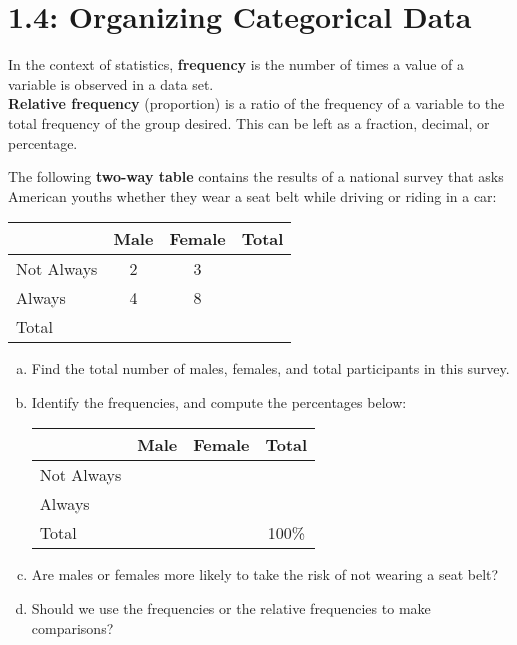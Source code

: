 \documentclass[../mathNotesPreamble]{subfiles}
\begin{document}
  \section{1.4: Organizing Categorical Data}
    \begin{defn*}
      In the context of statistics, \textbf{frequency} is the number of times a value of a variable is observed in a data set.\\
\textbf{Relative frequency} (proportion) is a ratio of the frequency of a variable to the total frequency of the group desired. This can be left as a fraction, decimal, or percentage.
    \end{defn*}

    \begin{ex*}
      The following \textbf{two-way table} contains the results of a national survey that asks American youths whether they wear a seat belt while driving or riding in a car:
    \end{ex*}
    \begin{center}
      \begin{tabular}{@{}l*{3}{c}@{}}\toprule
        & Male & Female & Total\\\midrule
        Not Always& 2& 3& \\
        Always& 4& 8& \\\midrule
        Total\\\bottomrule
      \end{tabular}
    \end{center}
    \begin{enumerate}[a)]
      \item Find the total number of males, females, and total participants in this survey.
      \item Identify the frequencies, and compute the percentages below:
        \begin{center}
          \hspace*{-30pt}
          \begin{tabular}{@{}l*{3}{c}@{}}\toprule
            & Male & Female & Total\\\midrule
            Not Always& & & \\
            Always& & & \\\midrule
            Total&&&100\%\\\bottomrule
          \end{tabular}
        \end{center}
      \item Are males or females more likely to take the risk of not wearing a seat belt?\\[\stretch{1}]
      \item Should we use the frequencies or the relative frequencies to make comparisons?
    \end{enumerate}

  \pagebreak
\end{document}
